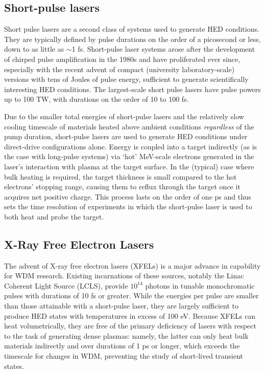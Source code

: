 \documentclass [11pt, proquest, article] {uwthesis}[2016/11/22]
\begin{document}
\subsection{Short-pulse lasers}
Short pulse lasers are a second class of systems used to generate HED conditions. They are typically defined by pulse durations on the order of a picosecond or less, down to as little as $\sim$1 fs. Short-pulse laser systems arose after the development of chirped pulse amplification in the 1980s and have proliferated ever since, especially with the recent advent of compact (university laboratory-scale) versions with tens of Joules of pulse energy, sufficient to generate scientifically interesting HED conditions. \cite{maine1988generation, boehly1997initial} The largest-scale short pulse lasers have pulse powers up to 100 TW, with durations on the order of 10 to 100 fs.

Due to the smaller total energies of short-pulse lasers and the relatively slow cooling timescale of materials heated above ambient conditions \textit{regardless} of the pump duration, short-pulse lasers are used to generate HED conditions under direct-drive configurations alone. Energy is coupled into a target indirectly (as is the case with long-pulse systems) via `hot' MeV-scale electrons generated in the laser's interaction with plasma at the target surface. In the (typical) case where bulk heating is required, the target thickness is small compared to the hot electrons' stopping range, causing them to reflux through the target once it acquires net positive charge. This process lasts on the order of one ps and thus sets the time resolution of experiments in which the short-pulse laser is used to both heat and probe the target. \cite{nilson2010scaling}

\label{foobar}
\subsection{X-Ray Free Electron Lasers}
The advent of X-ray free electron lasers (XFELs) is a major advance in capability for WDM research. Existing incarnations of these sources, notably the Linac Coherent Light Source (LCLS), provide $10^{14}$ photons in tunable monochromatic pulses with durations of 10 fs or greater. While the energies per pulse are smaller than those attainable with a short-pulse laser, they are largely sufficient to produce HED states with temperatures in excess of 100 eV. \cite{vinko2012creation} Because XFELs can heat volumetrically, they are free of the primary deficiency of lasers with respect to the task of generating dense plasmas: namely, the latter can only heat bulk materials indirectly and over durations of 1 ps or longer, which exceeds the timescale for changes in WDM, preventing the study of short-lived transient states.
\end{document}
